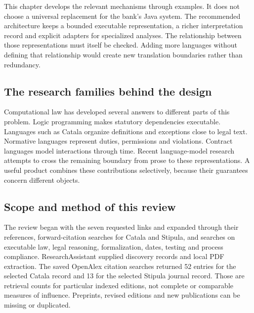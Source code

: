 This chapter develops the relevant mechanisms through examples. It does not
choose a universal replacement for the bank's Java system. The recommended
architecture keeps a bounded executable representation, a richer interpretation
record and explicit adapters for specialized analyses. The relationship between
those representations must itself be checked. Adding more languages without
defining that relationship would create new translation boundaries rather than
redundancy.

\subsection{The research families behind the design}
\label{merge:P-02-literature:00}

\label{sec:literature}

Computational law has developed several answers to different parts of this
problem. Logic programming makes statutory dependencies executable. Languages
such as Catala organize definitions and exceptions close to legal text. Normative
languages represent duties, permissions and violations. Contract languages model
interactions through time. Recent language-model research attempts to cross the
remaining boundary from prose to these representations. A useful product combines
these contributions selectively, because their guarantees concern different
objects.

\subsection{Scope and method of this review}
\label{merge:P-02-literature:01}


The review began with the seven requested links and expanded through their
references, forward-citation searches for Catala and Stipula, and searches on
executable law, legal reasoning, formalization, dates, testing and process
compliance. ResearchAssistant supplied discovery records and local PDF extraction.
The saved OpenAlex citation searches returned 52 entries for the selected Catala
record and 13 for the selected Stipula journal record. Those are retrieval counts
for particular indexed editions, not complete or comparable measures of influence.
Preprints, revised editions and new publications can be missing or duplicated.


